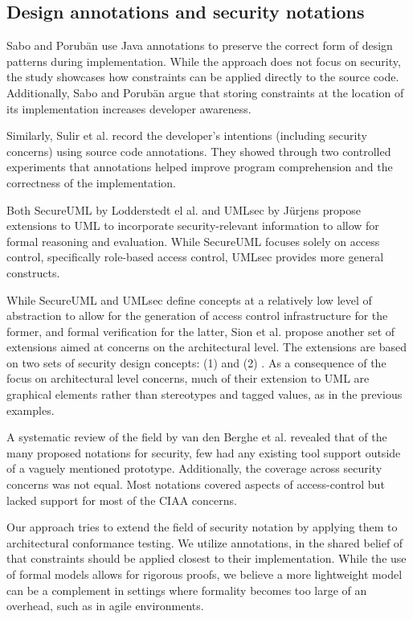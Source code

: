 \subsection{Design annotations and security notations}

Sabo and Porubän \cite{sabo_preserving_2009} use Java annotations to preserve the correct form of design patterns during implementation. While the approach does not focus on security, the study showcases how constraints can be applied directly to the source code. Additionally, Sabo and Porubän argue that storing constraints at the location of its implementation increases developer awareness. 

Similarly, Sulir et al. \cite{sulir_recording_2016} record the developer's intentions (including security concerns) using source code annotations. They showed through two controlled experiments that annotations helped improve program comprehension and the correctness of the implementation.

Both SecureUML by Lodderstedt el al. \cite{goos_secureuml_2002} and UMLsec by Jürjens \cite{goos_umlsec_2002} propose extensions to UML to incorporate security-relevant information to allow for formal reasoning and evaluation. While SecureUML focuses solely on access control, specifically role-based access control, UMLsec provides more general constructs.

While SecureUML and UMLsec define concepts at a relatively low level of abstraction to allow for the generation of access control infrastructure for the former, and formal verification for the latter, Sion et al. \cite{sion_masc_2015} propose another set of extensions aimed at concerns on the architectural level. The extensions are based on two sets of security design concepts: (1)  and (2) . As a consequence of the focus on architectural level concerns, much of their extension to UML are graphical elements rather than stereotypes and tagged values, as in the previous examples. 

A systematic review of the field by van den Berghe et al. \cite{vandenberghe_design_2017} revealed that of the many proposed notations for security, few had any existing tool support outside of a vaguely mentioned prototype. Additionally, the coverage across security concerns was not equal. Most notations covered aspects of access-control but lacked support for most of the CIAA concerns. 

Our approach tries to extend the field of security notation by applying them to architectural conformance testing. We utilize annotations, in the shared belief of \cite{sabo_preserving_2009} that constraints should be applied closest to their implementation. While the use of formal models allows for rigorous proofs, we believe a more lightweight model can be a complement in settings where formality becomes too large of an overhead, such as in agile environments. 